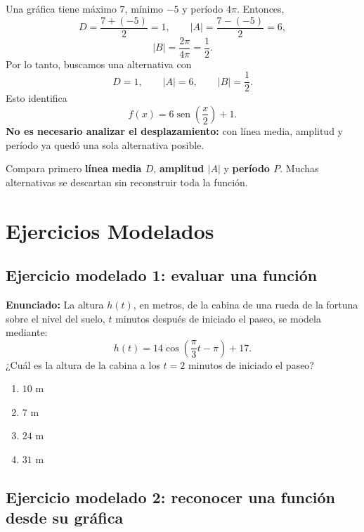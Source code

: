 \documentclass[12pt,letterpaper]{article}
\providecommand{\sen}{\operatorname{sen}}
\begin{document}
\begin{ejemplobox}
Una gráfica tiene máximo $7$, mínimo $-5$ y período $4\pi$.
Entonces,
\[
D=\frac{7+(-5)}{2}=1,
\qquad
|A|=\frac{7-(-5)}{2}=6,
\]
\[
|B|=\frac{2\pi}{4\pi}=\frac12.
\]
Por lo tanto, buscamos una alternativa con
\[
D=1,
\qquad
|A|=6,
\qquad
|B|=\frac12.
\]
Esto identifica
\[
\boxed{f(x)=6\sen\left(\frac{x}{2}\right)+1}.
\]
\textbf{No es necesario analizar el desplazamiento:} con línea media, amplitud y período ya quedó una sola alternativa posible.
\end{ejemplobox}

\begin{formulabox}
Compara primero \textbf{línea media $D$}, \textbf{amplitud $|A|$} y \textbf{período $P$}. Muchas alternativas se descartan sin reconstruir toda la función.
\end{formulabox}
\newpage
\section{Ejercicios Modelados}

\subsection*{Ejercicio modelado 1: evaluar una función}

\textbf{Enunciado:} La altura $h(t)$, en metros, de la cabina de una rueda de la fortuna sobre el nivel del suelo, $t$ minutos después de iniciado el paseo, se modela mediante:
\[
h(t)=14\cos\left(\frac{\pi}{3}t-\pi\right)+17.
\]
¿Cuál es la altura de la cabina a los $t=2$ minutos de iniciado el paseo?

\begin{enumerate}[label=\Alph*)]
    \item $10\text{ m}$
    \item $7\text{ m}$
    \item $24\text{ m}$
    \item $31\text{ m}$
\end{enumerate}

\vspace{3cm}
\subsection*{Ejercicio modelado 2: reconocer una función desde su gráfica}
\end{document}
